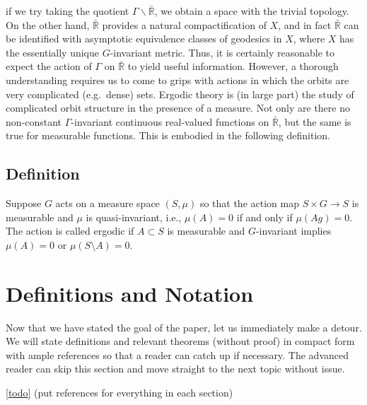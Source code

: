 \documentclass[
]{article}
\begin{document}
if we try taking the quotient \(\Gamma\backslash\bar{\mathbb{R}}\), we
obtain a space with the trivial topology. On the other hand,
\(\bar{\mathbb{R}}\) provides a natural compactification of \(X\), and
in fact \(\bar{\mathbb{R}}\) can be identified with asymptotic
equivalence classes of geodesics in \(X\), where \(X\) has the
essentially unique \(G\)-invariant metric. Thus, it is certainly
reasonable to expect the action of \(\Gamma\) on \(\bar{\mathbb{R}}\) to
yield useful information. However, a thorough understanding requires us
to come to grips with actions in which the orbits are very complicated
(e.g.~dense) sets. Ergodic theory is (in large part) the study of
complicated orbit structure in the presence of a measure. Not only are
there no non-constant \(\Gamma\)-invariant continuous real-valued
functions on \(\bar{\mathbb{R}}\), but the same is true for measurable
functions. This is embodied in the following definition.

\hypertarget{definition}{%
\subsection{Definition}\label{definition}}

Suppose \(G\) acts on a measure space \((S, \mu)\) so that the action
map \(S \times G \rightarrow S\) is measurable and \(\mu\) is
quasi-invariant, i.e., \(\mu(A) = 0\) if and only if \(\mu(Ag) = 0\).
The action is called ergodic if \(A \subset S\) is measurable and
\(G\)-invariant implies \(\mu(A) = 0\) or \(\mu(S\setminus A) = 0\).








\hypertarget{definitions-and-notation}{%
\section{Definitions and Notation}\label{definitions-and-notation}}

Now that we have stated the goal of the paper, let us immediately make a
detour. We will state definitions and relevant theorems (without proof)
in compact form with ample references so that a reader can catch up if
necessary. The advanced reader can skip this section and move straight
to the next topic without issue.

\href{ergodicity}{{[}todo{]}} (put references for everything in each
section)
\end{document}
